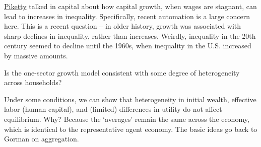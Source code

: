 \documentclass[10pt]{article}
\begin{document}
\href{https://en.wikipedia.org/wiki/Thomas_Piketty}{Piketty} talked in capital about how capital growth, when wages are stagnant, can lead to increases in inequality. Specifically, recent automation is a large concern here. This is a recent question -- in older history, growth was associated with sharp declines in inequality, rather than increases. Weirdly, inequality in the 20th century seemed to decline until the 1960s, when inequality in the U.S. increased by massive amounts.

\begin{question}
	Is the one-sector growth model consistent with some degree of heterogeneity across households?
\end{question}

Under some conditions, we can show that heterogeneity in initial wealth, effective labor (\ie human capital), and (limited) differences in utility do not affect equilibrium. Why? Because the `averages' remain the same across the economy, which is identical to the representative agent economy. The basic ideas go back to Gorman on aggregation.
\end{document}
